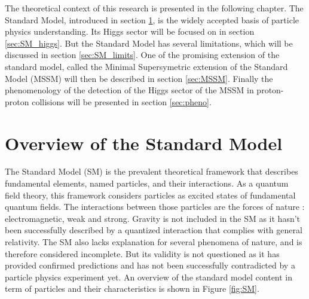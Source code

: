 




The theoretical context of this research is presented in the following chapter. The Standard Model, introduced in section \ref{sec:SM}, is the widely accepted basis of particle physics understanding. Its Higgs sector will be focused on in section \ref{sec:SM_higgs}. But the Standard Model has several limitations, which will be discussed in section \ref{sec:SM_limits}. One of the promising extension of the standard model, called the Minimal Supersymetric extension of the Standard Model (MSSM) will then be described in section \ref{sec:MSSM}. Finally the phenomenology of the detection of the Higgs sector of the MSSM in proton-proton collisions will be presented in section \ref{sec:pheno}.

\section{Overview of the Standard Model}
\label{sec:SM}
The Standard Model (SM) is the prevalent theoretical framework that describes fundamental elements, named particles, and their interactions. As a quantum field theory, this framework considers particles as excited states of fundamental quantum fields. The interactions between those particles are the forces of nature : electromagnetic, weak and strong. Gravity is not included in the SM as it hasn't been successfully described by a quantized interaction that complies with general relativity. The SM also lacks explanation for several phenomena of nature, and is therefore considered incomplete. But its validity is not questioned as it has provided confirmed predictions and has not been successfully contradicted by a particle physics experiment yet. An overview of the standard model content in term of particles and their characteristics is shown in Figure \ref{fig:SM}.\newline

